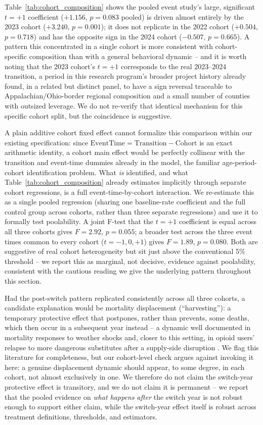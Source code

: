 \documentclass{article}
\begin{document}
Table~\ref{tab:cohort_composition} shows the pooled event study's large, significant $t=+1$ coefficient
($+1.156$, $p=0.083$ pooled) is driven almost entirely by the 2023 cohort ($+3.240$, $p=0.001$); it does not
replicate in the 2022 cohort ($+0.504$, $p=0.718$) and has the opposite sign in the 2024 cohort ($-0.507$,
$p=0.665$). A pattern this concentrated in a single cohort is more consistent with cohort-specific composition than
with a general behavioral dynamic -- and it is worth noting that the 2023 cohort's $t=+1$ corresponds to the real
2023--2024 transition, a period in this research program's broader project history already found, in a related but
distinct panel, to have a sign reversal traceable to Appalachian/Ohio-border regional composition and a small
number of counties with outsized leverage. We do not re-verify that identical mechanism for this specific cohort
split, but the coincidence is suggestive.

A plain additive cohort fixed effect cannot formalize this comparison within our existing specification: since
$\text{EventTime} = \text{Transition} - \text{Cohort}$ is an exact arithmetic identity, a cohort main effect would
be perfectly collinear with the transition and event-time dummies already in the model, the familiar
age-period-cohort identification problem. What \emph{is} identified, and what Table~\ref{tab:cohort_composition}
already estimates implicitly through separate cohort regressions, is a full event-time-by-cohort interaction. We
re-estimate this as a single pooled regression (sharing one baseline-rate coefficient and the full control group
across cohorts, rather than three separate regressions) and use it to formally test poolability. A joint F-test
that the $t=+1$ coefficient is equal across all three cohorts gives $F=2.92$, $p=0.055$; a broader test across the
three event times common to every cohort ($t=-1,0,+1$) gives $F=1.89$, $p=0.080$. Both are suggestive of real
cohort heterogeneity but sit just above the conventional 5\% threshold -- we report this as marginal, not decisive,
evidence against poolability, consistent with the cautious reading we give the underlying pattern throughout this
section.

Had the post-switch pattern replicated consistently across all three cohorts, a candidate explanation would be
mortality displacement (``harvesting''): a temporary protective effect that postpones, rather than prevents, some
deaths, which then occur in a subsequent year instead -- a dynamic well documented in mortality responses to
weather shocks \citep{DeschenesMoretti2009,Schwartz2000} and, closer to this setting, in opioid users' relapse to
more dangerous substitutes after a supply-side disruption \citep{AlpertPowellPacula2018}. We flag this literature
for completeness, but our cohort-level check argues against invoking it here: a genuine displacement dynamic should
appear, to some degree, in each cohort, not almost exclusively in one. We therefore do not claim the switch-year
protective effect is transitory, and we do not claim it is permanent -- we report that the pooled evidence on
\emph{what happens after} the switch year is not robust enough to support either claim, while the switch-year
effect itself is robust across treatment definitions, thresholds, and estimators.
\end{document}
